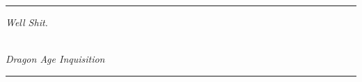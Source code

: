 
\mbox{}
\vspace{.75in}
\hrule

\vspace{2in}


\begin{centering}
	\hspace{.25in} 
	\parbox{5in}{
		\noindent 
		\textit{Well Shit.}
		\vspace{3pt}

		\begin{flushright}
			{}\\
			{\textit{Dragon Age Inquisition}}
		\end{flushright}
	}
\end{centering}
\vspace{2.25in}
\hrule
\vfill


















\textwidth 5.750in \textheight=8.50in \headheight 0.0625in \topmargin 0.0in %

